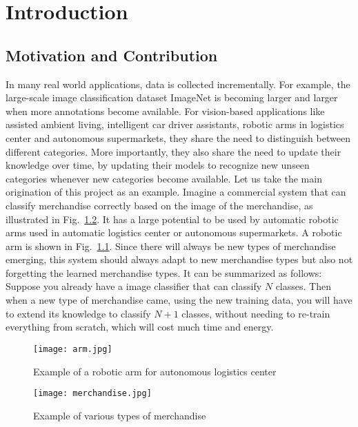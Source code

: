 
\chapter{Introduction}
\label{chap:intro}
\section{Motivation and Contribution}
In many real world applications, data is collected incrementally. For example, the large-scale image classification dataset ImageNet is becoming larger and larger when more annotations become available. For vision-based applications like assisted ambient living, intelligent car driver assistants, robotic arms in logistics center and autonomous supermarkets, they share the need to distinguish between different categories. More importantly, they also share the need to update their knowledge over time, by updating their models to recognize new unseen categories whenever new categories become available. Let us take the main origination of this project as an example. Imagine a commercial system that can classify merchandise correctly based on the image of the merchandise, as illustrated in Fig.~\ref{fig:merchandise}. It has a large potential to be used by automatic robotic arms used in automatic logistics center or autonomous supermarkets. A robotic arm is shown in Fig.~\ref{fig:arm}. Since there will always be new types of merchandise emerging, this system should always adapt to new merchandise types but also not forgetting the learned merchandise types. It can be summarized as follows: Suppose you already have a image classifier that can classify $N$ classes. Then when a new type of merchandise came, using the new training data, you will have to extend its knowledge to classify $N+1$ classes, without needing to re-train everything from scratch, which will cost much time and energy.

\begin{figure}[!htp]
	\centering
	\texttt{[image: arm.jpg]}
	\caption[Example of a robotic arm for autonomous logistics center]
	{Example of a robotic arm for autonomous logistics center}
	\label{fig:arm}
\end{figure}
\begin{figure}[!htp]
	\centering
	\texttt{[image: merchandise.jpg]}
	\caption[Example of various types of merchandise]
	{Example of various types of merchandise}
	\label{fig:merchandise}
\end{figure}

